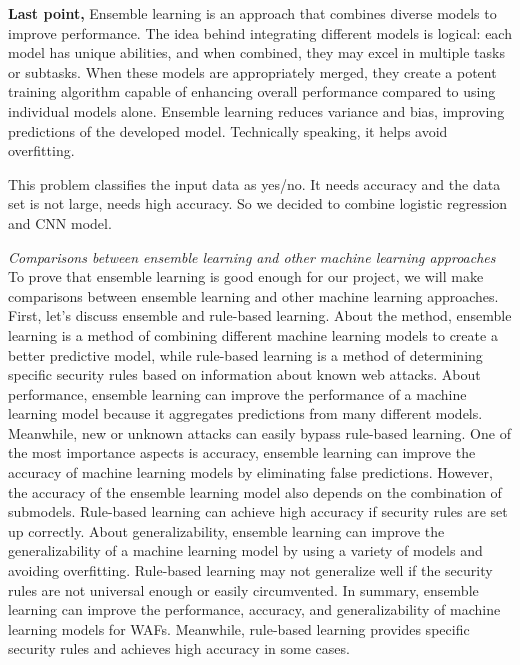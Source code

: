 \textbf{Last point,}
Ensemble learning is an approach that combines diverse models to improve performance. The idea behind integrating different models is logical: each model has unique abilities, and when combined, they may excel in multiple tasks or subtasks. When these models are appropriately merged, they create a potent training algorithm capable of enhancing overall performance compared to using individual models alone.
Ensemble learning reduces variance and bias, improving predictions of the developed model. Technically speaking, it helps avoid overfitting.

This problem classifies the input data as yes/no. It needs accuracy and the data set is not large, needs high accuracy. So we decided to combine logistic regression and CNN model.

\emph{Comparisons between ensemble learning and other machine learning approaches} \\
To prove that ensemble learning is good enough for our project, we will make comparisons between ensemble learning and other machine learning approaches.
First, let's discuss ensemble and rule-based learning. About the method, ensemble learning is a method of combining different machine learning models to create a better predictive model, while rule-based learning is a method of determining specific security rules based on information about known web attacks. About performance, ensemble learning can improve the performance of a machine learning model because it aggregates predictions from many different models. Meanwhile, new or unknown attacks can easily bypass rule-based learning. One of the most importance aspects is accuracy,
ensemble learning can improve the accuracy of machine learning models by eliminating false predictions. However, the accuracy of the ensemble learning model also depends on the combination of submodels. Rule-based learning can achieve high accuracy if security rules are set up correctly.
About generalizability, ensemble learning can improve the generalizability of a machine learning model by using a variety of models and avoiding overfitting. Rule-based learning may not generalize well if the security rules are not universal enough or easily circumvented. In summary, ensemble learning can improve the performance, accuracy, and generalizability of machine learning models for WAFs. Meanwhile, rule-based learning provides specific security rules and achieves high accuracy in some cases.

